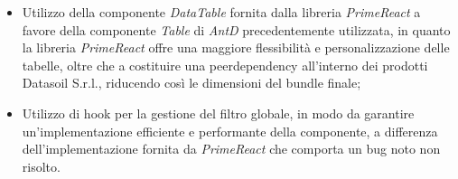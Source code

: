 \begin{itemize}
\begin{itemize}
                  \item Utilizzo della componente \textit{DataTable} fornita dalla libreria \textit{PrimeReact} a favore della componente \textit{Table} di \textit{AntD} precedentemente utilizzata,
                        in quanto la libreria \textit{PrimeReact} offre una maggiore flessibilità e personalizzazione delle tabelle, oltre che a costituire una peerdependency all'interno dei
                        prodotti Datasoil S.r.l., riducendo così le dimensioni del bundle finale;
                  \item Utilizzo di hook per la gestione del filtro globale, in modo da garantire un'implementazione efficiente e performante della componente, a differenza dell'implementazione
                        fornita da \textit{PrimeReact} che comporta un bug noto non risolto.
            \end{itemize}
\end{itemize}

